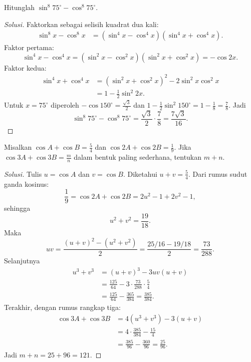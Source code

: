 \documentclass[12pt]{scrartcl}
\begin{document}
\begin{example}[OSK 2005]
Hitunglah $\sin^{8}75^{\circ} - \cos^{8}75^{\circ}$.
\end{example}
\begin{proof}[Solusi]
Faktorkan sebagai selisih kuadrat dua kali:
\begin{align*}
\sin^8 x - \cos^8 x
&= (\sin^4 x - \cos^4 x)(\sin^4 x + \cos^4 x).
\end{align*}
Faktor pertama:
\[ \sin^4 x - \cos^4 x = (\sin^2 x - \cos^2 x)(\sin^2 x + \cos^2 x) = -\cos 2x. \]
Faktor kedua:
\begin{align*}
\sin^4 x + \cos^4 x &= (\sin^2 x + \cos^2 x)^2 - 2\sin^2 x \cos^2 x \\
&= 1 - \frac{1}{2}\sin^2 2x.
\end{align*}
Untuk $x = 75^{\circ}$ diperoleh $-\cos 150^{\circ} = \frac{\sqrt{3}}{2}$ dan
$1 - \frac{1}{2}\sin^2 150^{\circ} = 1 - \frac{1}{8} = \frac{7}{8}$. Jadi
\[ \sin^{8}75^{\circ} - \cos^{8}75^{\circ}
= \frac{\sqrt{3}}{2} \cdot \frac{7}{8} = \frac{7\sqrt{3}}{16}. \]
\end{proof}

\begin{example}
Misalkan $\cos A + \cos B = \frac{5}{4}$ dan $\cos 2A + \cos 2B = \frac{1}{9}$.
Jika $\cos 3A + \cos 3B = \frac{m}{n}$ dalam bentuk paling sederhana,
tentukan $m+n$.
\end{example}
\begin{proof}[Solusi]
Tulis $u = \cos A$ dan $v = \cos B$. Diketahui $u + v = \frac{5}{4}$.
Dari rumus sudut ganda kosinus:
\[ \frac{1}{9} = \cos 2A + \cos 2B = 2u^2 - 1 + 2v^2 - 1, \]
sehingga
\[ u^2 + v^2 = \frac{19}{18}. \]
Maka
\[ uv = \frac{(u+v)^2 - (u^2+v^2)}{2}
= \frac{25/16 - 19/18}{2} = \frac{73}{288}. \]
Selanjutnya
\begin{align*}
u^3 + v^3 &= (u+v)^3 - 3uv(u+v) \\
&= \frac{125}{64} - 3 \cdot \frac{73}{288} \cdot \frac{5}{4} \\
&= \frac{125}{64} - \frac{365}{384} = \frac{385}{384}.
\end{align*}
Terakhir, dengan rumus rangkap tiga:
\begin{align*}
\cos 3A + \cos 3B &= 4(u^3+v^3) - 3(u+v) \\
&= 4 \cdot \frac{385}{384} - \frac{15}{4} \\
&= \frac{385}{96} - \frac{360}{96} = \frac{25}{96}.
\end{align*}
Jadi $m + n = 25 + 96 = 121$.
\end{proof}
\end{document}
